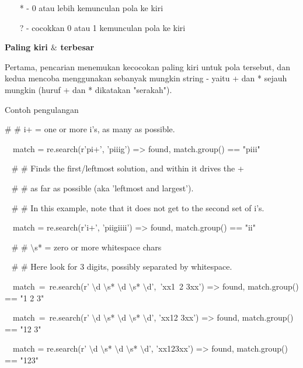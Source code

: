 \begin {enumerate}
\begin {enumerate}
\noindent
~~~ * - 0 atau lebih kemunculan pola ke kiri \par
\noindent
~~~ ? - cocokkan 0 atau 1 kemunculan pola ke kiri \par
\vspace{12pt}
\vspace{14pt}
\noindent
{\fontsize{14pt}{14pt}\selectfont \textbf{Paling kiri  $  \&  $ terbesar} \\} \par
Pertama, pencarian menemukan kecocokan paling kiri untuk pola tersebut, dan kedua mencoba menggunakan sebanyak mungkin string - yaitu + dan * sejauh mungkin (huruf + dan * dikatakan "serakah"). \par
\noindent
Contoh pengulangan \par
\vspace{12pt}
\noindent
 $  \#  $ $  \#  $ i+ = one or more i's, as many as possible. \par
\noindent
~~match = re.search(r'pi+', 'piiig') =>  found, match.group() == "piii" \par
\vspace{12pt}
\noindent
~  $  \#  $ $  \#  $ Finds the first/leftmost solution, and within it drives the + \par
\noindent
~  $  \#  $ $  \#  $ as far as possible (aka 'leftmost and largest'). \par
\noindent
~  $  \#  $ $  \#  $ In this example, note that it does not get to the second set of i's. \par
\noindent
~~match = re.search(r'i+', 'piigiiii') =>  found, match.group() == "ii" \par
\vspace{12pt}
\noindent
~  $  \#  $ $  \#  $  $  \setminus  $s* = zero or more whitespace chars \par
\noindent
~  $  \#  $ $  \#  $ Here look for 3 digits, possibly separated by whitespace. \par
\noindent
~~match~=~re.search(r' $  \setminus  $d $  \setminus  $s* $  \setminus  $d $  \setminus  $s* $  \setminus  $d',~'xx1~2   3xx') =>  found, match.group() == "1 2   3" \par
\noindent
~~match~=~re.search(r' $  \setminus  $d $  \setminus  $s* $  \setminus  $d $  \setminus  $s* $  \setminus  $d', 'xx12  3xx') =>  found, match.group() == "12  3" \par
\noindent
~~match = re.search(r' $  \setminus  $d $  \setminus  $s* $  \setminus  $d $  \setminus  $s* $  \setminus  $d', 'xx123xx') =>  found, match.group() == "123" \par

\end{enumerate}
\end{enumerate}
